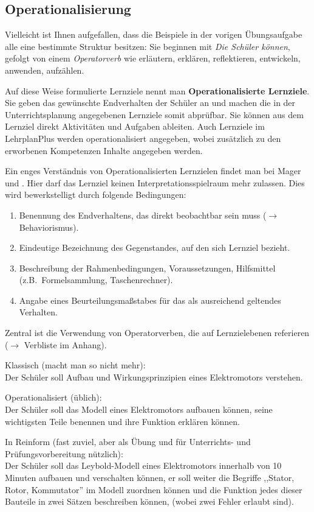 \subsection{Operationalisierung}
Vielleicht ist Ihnen aufgefallen, dass die Beispiele in der vorigen Übungsaufgabe alle eine bestimmte Struktur besitzen: Sie beginnen mit \emph{Die Schüler können}, gefolgt von einem \emph{Operatorverb} wie erläutern, erklären, reflektieren, entwickeln, anwenden, aufzählen.

\mip
Auf diese Weise formulierte Lernziele nennt man \textbf{Operationalisierte Lernziele}. Sie geben das gewünschte Endverhalten der Schüler an und machen die in der Unterrichtsplanung angegebenen Lernziele somit abprüfbar. Sie können aus dem Lernziel direkt Aktivitäten und Aufgaben ableiten. Auch Lernziele im LehrplanPlus werden operationalisiert angegeben, wobei zusätzlich zu den erworbenen Kompetenzen Inhalte angegeben werden.

\mip
Ein enges Verständnis von Operationalisierten Lernzielen findet man bei Mager und \textcite{Gagne}. Hier darf das Lernziel keinen Interpretationsspielraum mehr zulassen. Dies wird bewerkstelligt durch folgende Bedingungen:
\begin{enumerate}
	\item	Benennung des Endverhaltens, das direkt beobachtbar sein muss ($\to$ Behaviorismus).
	\item	Eindeutige Bezeichnung des Gegenstandes, auf den sich Lernziel bezieht.
	\item	Beschreibung der Rahmenbedingungen, Voraussetzungen, Hilfsmittel (z.B.\ Formelsammlung, Taschenrechner).
	\item	Angabe eines Beurteilungsma{\ss}stabes  f\"{u}r das als ausreichend 	geltendes Verhalten.
\end{enumerate} 
Zentral ist die Verwendung von Operatorverben, die auf Lernzielebenen referieren ($\to$ Verbliste im Anhang).

\begin{beisp}
	Klassisch (macht man so nicht mehr): \\ 
	Der Sch\"{u}ler soll Aufbau und Wirkungsprinzipien eines
	Elektromotors verstehen.
	
	\mip
	Operationalisiert (üblich): \\
	Der Sch\"{u}ler soll das Modell eines Elektromotors aufbauen k\"{o}nnen,
	seine wichtigsten Teile benennen und ihre Funktion erkl\"{a}ren k\"{o}nnen.
	
	\mip
	In Reinform (fast zuviel, aber als Übung und für Unterrichts- und Prüfungsvorbereitung nützlich): \\
	Der Sch\"{u}ler soll das Leybold-Modell eines Elektromotors
		innerhalb von 10 Minuten aufbauen und verschalten k\"{o}nnen, er
		soll weiter die Begriffe ,,Stator, Rotor, Kommutator'' im
		Modell zuordnen k\"{o}nnen und die Funktion jedes dieser Bauteile
		in zwei S\"{a}tzen beschreiben k\"{o}nnen, (wobei zwei Fehler erlaubt
		sind).
\end{beisp}

